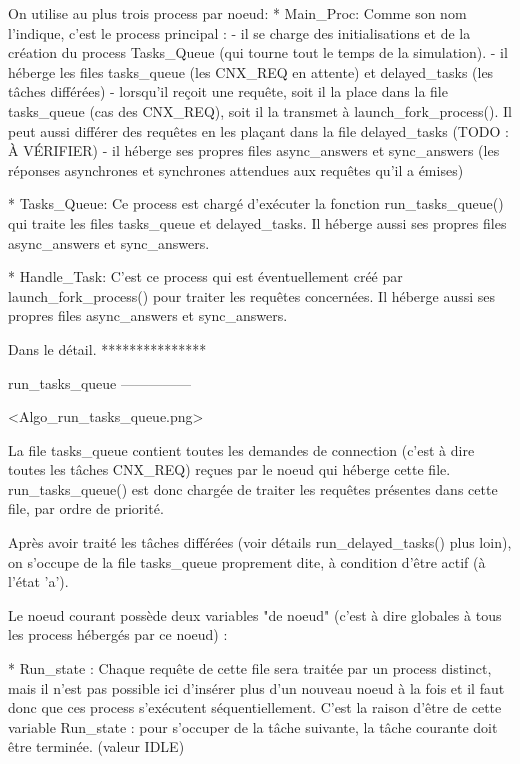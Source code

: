 On utilise au plus trois process par noeud:
    * Main_Proc:
      Comme son nom l'indique, c'est le process principal :
        - il se charge des initialisations et de la création du process Tasks_Queue (qui tourne
          tout le temps de la simulation).
        - il héberge les files tasks_queue (les CNX_REQ en attente) et delayed_tasks (les tâches
          différées)
        - lorsqu'il reçoit une requête, soit il la place dans la file tasks_queue (cas des
          CNX_REQ), soit il la transmet à launch_fork_process(). Il peut aussi différer des requêtes
          en les plaçant dans la file delayed_tasks (TODO : À VÉRIFIER)
        - il héberge ses propres files async_answers et sync_answers (les réponses asynchrones et
          synchrones attendues aux requêtes qu'il a émises)

    * Tasks_Queue:
      Ce process est chargé d'exécuter la fonction run_tasks_queue() qui traite les files
      tasks_queue et delayed_tasks.
      Il héberge aussi ses propres files async_answers et sync_answers.

    * Handle_Task:
      C'est ce process qui est éventuellement créé par launch_fork_process() pour traiter les
      requêtes concernées.
      Il héberge aussi ses propres files async_answers et sync_answers.

Dans le détail.
***************

run_tasks_queue
---------------

<Algo_run_tasks_queue.png>

La file tasks_queue contient toutes les demandes de connection (c'est à dire toutes les tâches
CNX_REQ) reçues par le noeud qui héberge cette file. run_tasks_queue() est donc chargée de traiter
les requêtes présentes dans cette file, par ordre de priorité.

Après avoir traité les tâches différées (voir détails run_delayed_tasks() plus loin), on s'occupe de
la file tasks_queue proprement dite, à condition d'être actif (à l'état 'a').

Le noeud courant possède deux variables "de noeud" (c'est à dire globales à tous les process
hébergés par ce noeud) :

* Run_state :
Chaque requête de cette file sera traitée par un process distinct, mais il n'est pas possible ici
d'insérer plus d'un nouveau noeud à la fois et il faut donc que ces process s'exécutent
séquentiellement. C'est la raison d'être de cette variable Run_state : pour s'occuper de la tâche
suivante, la tâche courante doit être terminée. (valeur IDLE)

